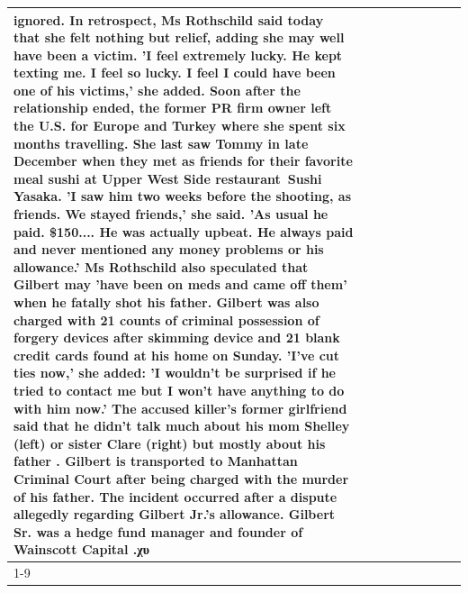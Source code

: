 \begin{table}[H]
\begin{tabular}{lllrlllll}
ignored. In retrospect, Ms Rothschild said today that she felt nothing but relief, adding she may well have been a victim. 'I feel extremely lucky. He kept texting me. I feel so lucky. I feel I could have been one of his victims,' she added. Soon after the relationship ended, the former PR firm owner left the U.S. for Europe and Turkey where she spent six months  travelling. She last saw Tommy in late December when they met as friends for their favorite meal sushi at Upper West Side restaurant Sushi Yasaka. 'I saw him two weeks before the shooting, as friends. We stayed friends,' she said. 'As usual he paid. \$150.... He was actually upbeat. He always paid and never mentioned any money problems or his allowance.' Ms Rothschild also speculated that Gilbert may 'have been on meds and came off them' when he fatally shot his father. Gilbert was also charged with 21 counts of criminal possession of forgery devices after skimming device and 21 blank credit cards found at his home on Sunday. 'I've cut ties now,' she added: 'I wouldn’t be surprised if he tried to contact me but I won’t have anything to do with him now.' The accused killer's former girlfriend said that he didn't talk much about his mom Shelley (left) or sister Clare (right) but mostly about his father . Gilbert is transported to Manhattan Criminal Court  after being charged with the murder of his father. The incident occurred after a dispute allegedly regarding Gilbert Jr.'s allowance. Gilbert Sr. was a hedge fund manager and founder of Wainscott Capital .χυ \\
\cline{1-9} \cline{2-9}

\end{tabular}
\end{table}
